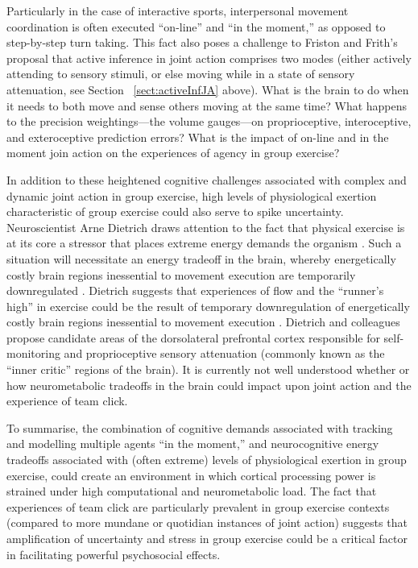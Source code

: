 \begin{CJK}{UTF8}{gbsn}
Particularly in the case of interactive sports, interpersonal movement coordination is often executed ``on-line'' and ``in the moment,'' as opposed to step-by-step turn taking.  This fact also poses a challenge to Friston and Frith's proposal that active inference in joint action comprises two modes (either actively attending to sensory stimuli, or else moving while in a state of sensory attenuation, see Section ~\ref{sect:activeInfJA} above).  What is the brain to do when it needs to both move and sense others moving at the same time?  What happens to the precision weightings---the volume gauges---on proprioceptive, interoceptive, and exteroceptive prediction errors?  What is the impact of on-line and in the moment join action on the experiences of agency in group exercise?

In addition to these heightened cognitive challenges associated with complex and dynamic joint action in group exercise, high levels of physiological exertion characteristic of group exercise could also serve to spike uncertainty.  Neuroscientist Arne Dietrich draws attention to the fact that physical exercise is at its core a stressor that places extreme energy demands the organism \citep{Dietrich2011}.
Such a situation will necessitate an energy tradeoff in the brain, whereby energetically costly brain regions inessential to movement execution are temporarily downregulated \citep{Dietrich2004b}.  Dietrich suggests that experiences of flow and the ``runner's high'' in exercise could be the result of temporary downregulation of energetically costly brain regions inessential to movement execution  \citep{Dietrich2004b}.  Dietrich and colleagues propose candidate areas of the dorsolateral prefrontal cortex responsible for self-monitoring and proprioceptive sensory attenuation (commonly known as the ``inner critic'' regions of the brain).  It is currently not well understood whether or how neurometabolic tradeoffs in the brain could impact upon joint action and the experience of team click.

To summarise, the combination of cognitive demands associated with tracking and modelling multiple agents ``in the moment,'' and neurocognitive energy tradeoffs associated with (often extreme) levels of physiological exertion in group exercise, could create an environment in which cortical processing power is strained under high computational and neurometabolic load.  The fact that experiences of team click are particularly prevalent in group exercise contexts (compared to more mundane or quotidian instances of joint action) suggests that amplification of uncertainty and stress in group exercise could be a critical factor in facilitating powerful psychosocial effects.



\end{CJK}
